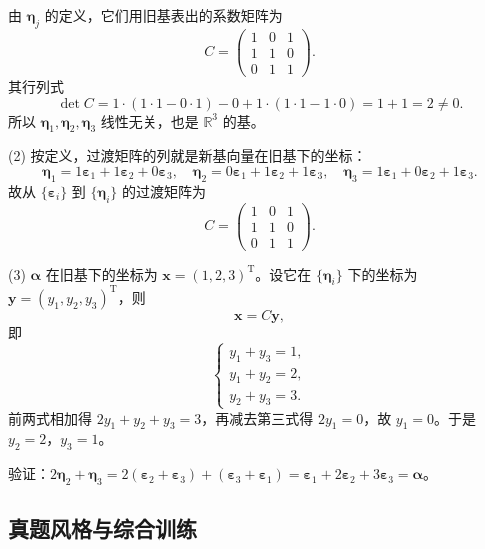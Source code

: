 由 $\boldsymbol{\eta}_j$ 的定义，它们用旧基表出的系数矩阵为
\[
C=\begin{pmatrix}
1&0&1\\
1&1&0\\
0&1&1
\end{pmatrix}.
\]
其行列式
\[
\det C=1\cdot(1\cdot 1-0\cdot 1)-0+1\cdot(1\cdot 1-1\cdot 0)=1+1=2\neq 0.
\]
所以 $\boldsymbol{\eta}_1,\boldsymbol{\eta}_2,\boldsymbol{\eta}_3$ 线性无关，也是 $\mathbb{R}^3$ 的基。

(2) 按定义，过渡矩阵的列就是新基向量在旧基下的坐标：
\[
\boldsymbol{\eta}_1=1\boldsymbol{\varepsilon}_1+1\boldsymbol{\varepsilon}_2+0\boldsymbol{\varepsilon}_3,\quad
\boldsymbol{\eta}_2=0\boldsymbol{\varepsilon}_1+1\boldsymbol{\varepsilon}_2+1\boldsymbol{\varepsilon}_3,\quad
\boldsymbol{\eta}_3=1\boldsymbol{\varepsilon}_1+0\boldsymbol{\varepsilon}_2+1\boldsymbol{\varepsilon}_3.
\]
故从 $\{\boldsymbol{\varepsilon}_i\}$ 到 $\{\boldsymbol{\eta}_i\}$ 的过渡矩阵为
\[
C=\begin{pmatrix}
1&0&1\\
1&1&0\\
0&1&1
\end{pmatrix}.
\]

(3) $\boldsymbol{\alpha}$ 在旧基下的坐标为 $\boldsymbol{x}=(1,2,3)^\mathrm{T}$。设它在 $\{\boldsymbol{\eta}_i\}$ 下的坐标为 $\boldsymbol{y}=(y_1,y_2,y_3)^\mathrm{T}$，则
\[
\boldsymbol{x}=C\boldsymbol{y},
\]
即
\[
\begin{cases}
y_1+y_3=1,\\
y_1+y_2=2,\\
y_2+y_3=3.
\end{cases}
\]
前两式相加得 $2y_1+y_2+y_3=3$，再减去第三式得 $2y_1=0$，故 $y_1=0$。于是 $y_2=2$，$y_3=1$。

验证：$2\boldsymbol{\eta}_2+\boldsymbol{\eta}_3=2(\boldsymbol{\varepsilon}_2+\boldsymbol{\varepsilon}_3)+(\boldsymbol{\varepsilon}_3+\boldsymbol{\varepsilon}_1)=\boldsymbol{\varepsilon}_1+2\boldsymbol{\varepsilon}_2+3\boldsymbol{\varepsilon}_3=\boldsymbol{\alpha}$。

\else \answerarea[10] \fi%

\subsection{真题风格与综合训练}

